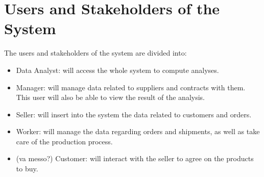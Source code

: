 \section{Users and Stakeholders of the System}
The users and stakeholders of the system are divided into:
\begin{itemize}
	\item Data Analyst: will access the whole system to compute analyses.
	\item Manager: will manage data related to suppliers and contracts with them. This user will also be able to view the result of the analysis.
	\item Seller: will insert into the system the data related to customers and orders.
	\item Worker: will manage the data regarding orders and shipments, as well as take care of the production process.
	\item (va messo?) Customer: will interact with the seller to agree on the products to buy.
\end{itemize}